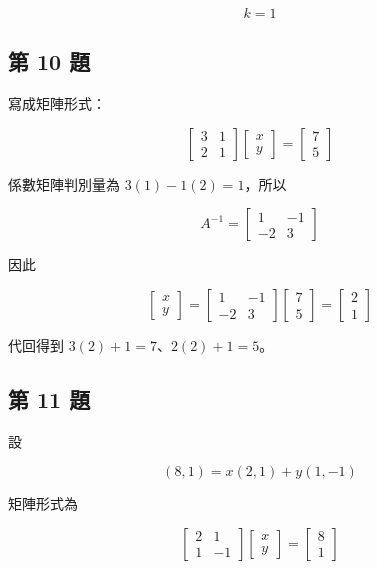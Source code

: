 \documentclass[11pt,a4paper]{article}
\begin{document}
\[
k=1
\]

\subsection{第 10 題}\label{ux7b2c-10-ux984c}

寫成矩陣形式：

\[
\begin{bmatrix}3&1\\2&1\end{bmatrix}
\begin{bmatrix}x\\y\end{bmatrix}
=\begin{bmatrix}7\\5\end{bmatrix}
\]

係數矩陣判別量為 \(3(1)-1(2)=1\)，所以

\[
A^{-1}=\begin{bmatrix}1&-1\\-2&3\end{bmatrix}
\]

因此

\[
\begin{bmatrix}x\\y\end{bmatrix}
=\begin{bmatrix}1&-1\\-2&3\end{bmatrix}
\begin{bmatrix}7\\5\end{bmatrix}
=\begin{bmatrix}2\\1\end{bmatrix}
\]

代回得到 \(3(2)+1=7\)、\(2(2)+1=5\)。

\subsection{第 11 題}\label{ux7b2c-11-ux984c}

設

\[
(8,1)=x(2,1)+y(1,-1)
\]

矩陣形式為

\[
\begin{bmatrix}2&1\\1&-1\end{bmatrix}
\begin{bmatrix}x\\y\end{bmatrix}
=\begin{bmatrix}8\\1\end{bmatrix}
\]
\end{document}
